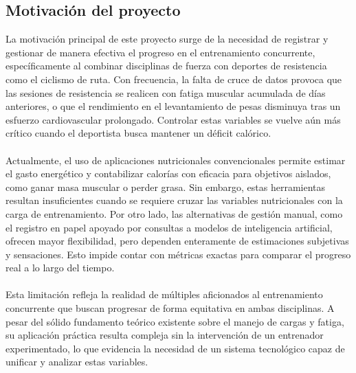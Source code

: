 \documentclass[12pt]{article}
\begin{document}
\subsection{Motivación del proyecto}
La motivación principal de este proyecto surge de la necesidad de registrar y gestionar de manera efectiva el progreso en el entrenamiento concurrente, específicamente al combinar disciplinas de fuerza con deportes de resistencia como el ciclismo de ruta. Con frecuencia, la falta de cruce de datos provoca que las sesiones de resistencia se realicen con fatiga muscular acumulada de días anteriores, o que el rendimiento en el levantamiento de pesas disminuya tras un esfuerzo cardiovascular prolongado. Controlar estas variables se vuelve aún más crítico cuando el deportista busca mantener un déficit calórico.
\\\\
Actualmente, el uso de aplicaciones nutricionales convencionales permite estimar el gasto energético y contabilizar calorías con eficacia para objetivos aislados, como ganar masa muscular o perder grasa. Sin embargo, estas herramientas resultan insuficientes cuando se requiere cruzar las variables nutricionales con la carga de entrenamiento. Por otro lado, las alternativas de gestión manual, como el registro en papel apoyado por consultas a modelos de inteligencia artificial, ofrecen mayor flexibilidad, pero dependen enteramente de estimaciones subjetivas y sensaciones. Esto impide contar con métricas exactas para comparar el progreso real a lo largo del tiempo.
\\\\
Esta limitación refleja la realidad de múltiples aficionados al entrenamiento concurrente que buscan progresar de forma equitativa en ambas disciplinas. A pesar del sólido fundamento teórico existente sobre el manejo de cargas y fatiga, su aplicación práctica resulta compleja sin la intervención de un entrenador experimentado, lo que evidencia la necesidad de un sistema tecnológico capaz de unificar y analizar estas variables.
\newpage
\end{document}
